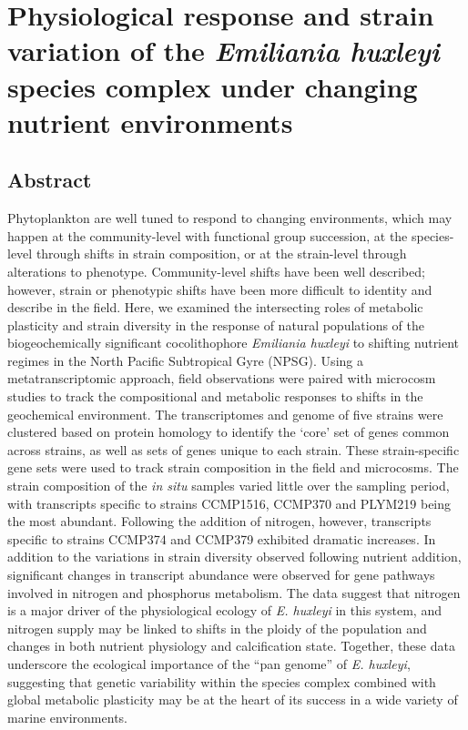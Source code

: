 

\chapter{Physiological response and strain variation of the \textsl{Emiliania huxleyi} species complex under changing nutrient environments}
\label{chap:5}
\raggedbottom


\clearpage

\section{Abstract} 
Phytoplankton are well tuned to respond to changing environments, which may happen at the community-level with functional group succession, at the species-level through shifts in strain composition, or at the strain-level through alterations to phenotype. Community-level shifts have been well described; however, strain or phenotypic shifts have been more difficult to identity and describe in the field. Here, we examined the intersecting roles of metabolic plasticity and strain diversity in the response of natural populations of the biogeochemically significant cocolithophore \textit{Emiliania huxleyi} to shifting nutrient regimes in the North Pacific Subtropical Gyre (NPSG). Using a metatranscriptomic approach, field observations were paired with microcosm studies to track the compositional and metabolic responses to shifts in the geochemical environment. The transcriptomes and genome of five strains were clustered based on protein homology to identify the `core' set of genes common across strains, as well as sets of genes unique to each strain. These strain-specific gene sets were used to track strain composition in the field and microcosms. The strain composition of the \textit{in situ} samples varied little over the sampling period, with transcripts specific to strains CCMP1516, CCMP370 and PLYM219 being the most abundant.  Following the addition of nitrogen, however, transcripts specific to strains CCMP374 and CCMP379 exhibited dramatic increases. In addition to the variations in strain diversity observed following nutrient addition, significant changes in transcript abundance were observed for gene pathways involved in nitrogen and phosphorus metabolism.  The data suggest that nitrogen is a major driver of the physiological ecology of \textit{E. huxleyi} in this system, and nitrogen supply may be linked to shifts in the ploidy of the population and changes in both nutrient physiology and calcification state. Together, these data underscore the ecological importance of the ``pan genome'' of \textit{E. huxleyi}, suggesting that genetic variability within the species complex combined with global metabolic plasticity may be at the heart of its success in a wide variety of marine environments. \par

